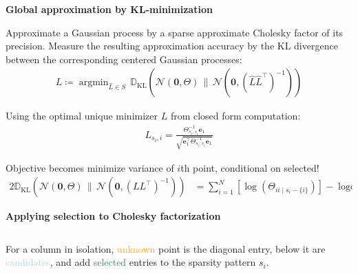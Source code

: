 \documentclass{beamer}                             %
\newcommand{\blocktitle}[1]{{\Large \textbf{#1}}}
\renewcommand{\vec}[1]{\bm{#1}}
\DeclareMathOperator{\logdet}{logdet}
\DeclareMathOperator*{\argmin}{argmin}
\begin{document}
\begin{frame}[t]
\begin{columns}[T]
\begin{column}{0.30\textwidth}
  \begin{tcolorbox}
    \blocktitle{Global approximation by KL-minimization}

    Approximate a Gaussian process by a sparse approximate Cholesky factor
    of its precision. Measure the resulting approximation accuracy by
    the KL divergence between the corresponding centered Gaussian processes:
    \begin{align*}
      L \coloneqq \argmin_{\hat{L} \in S} \, \mathbb{D}_{\text{KL}}
        \left (
          \mathcal{N}(\vec{0}, \Theta) \, \Big \| \,
          \mathcal{N}(\vec{0}, (\hat{L} \hat{L}^{\top})^{-1})
        \right )
    \end{align*}

    Using the optimal unique minimizer \( L \) from closed form computation:
    \begin{align*}
      L_{s_i, i} = \frac{\Theta_{s_i, s_i}^{-1} \vec{e}_1}
      {\sqrt{\vec{e}_1^{\top} \Theta_{s_i, s_i}^{-1} \vec{e}_1}}
    \end{align*}

    Objective becomes minimize variance of \(
    i \)th point, conditional on selected!
    \begin{align*}
      2 \mathbb{D}_{\text{KL}}
      \left (
        \mathcal{N}(\vec{0}, \Theta) \, \Big \| \,
        \mathcal{N}(\vec{0}, (L L^{\top})^{-1})
      \right )
      &= \sum_{i = 1}^N
        \left [
          \log \left ( \Theta_{ii \mid s_i - \{ i \}} \right )
        \right ]
        - \logdet(\Theta)
    \end{align*}
  \end{tcolorbox}

  \begin{tcolorbox}
    \blocktitle{Applying selection to Cholesky factorization}

    \begin{columns}
      \begin{column}{0.5\textwidth}
        For a column in isolation, \textcolor{orange}{unknown} point is the
        diagonal entry, below it are \textcolor{lightblue}{candidates}, and
        add \textcolor{seagreen}{selected} entries to the sparsity pattern
        \( s_i \).


\end{column}
\end{columns}
\end{tcolorbox}
\end{column}
\end{columns}
\end{frame}
\end{document}

